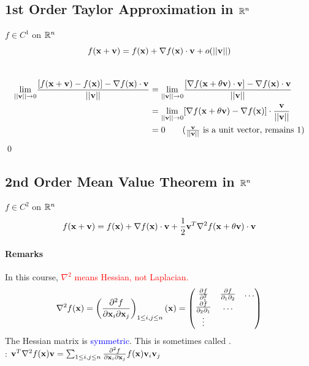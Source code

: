 \documentclass[11pt]{article}
\begin{document}
\subsection{1st Order Taylor Approximation in $\mathbb{R}^n$}
$f \in C^1$ on $\mathbb{R}^n$
$$f(\textbf{x} + \textbf{v}) = f(\textbf{x}) + \nabla f(\textbf{x}) \cdot \textbf{v} + o(||\textbf{v}||)$$
 \\
\begin{align*}
	\underset{||\vv|| \rightarrow 0}{\lim} \frac{[f(\vx + \vv) - f(\vx)] - \nabla f(\vx) \cdot \vv }{||\vv||} 
	&= \underset{||\vv|| \rightarrow 0}{\lim} \frac{[\nabla f(\vx + \theta \vv) \cdot \vv] - \nabla f(\vx) \cdot \vv}{||\vv||} \\
	&= \underset{||\vv|| \rightarrow 0}{\lim} [\nabla f(\vx + \theta \vv) - \nabla f(\vx)] \cdot \frac{\vv}{||\vv||} \\
	&= 0 \tag{$\frac{\vv}{||\vv||}$ is a unit vector, remains 1}
\end{align*}
\qed
\subsection{2nd Order Mean Value Theorem in $\mathbb{R}^n$}
$f \in C^2$ on $\mathbb{R} ^n$
$$ f(\textbf{x} + \textbf{v}) = f(\textbf{x}) + \nabla f(\textbf{x}) \cdot \textbf{v} + \frac{1}{2}\textbf{v}^T\nabla^2 f(\textbf{x} + \theta \textbf{v}) \cdot \textbf{v}$$
\paragraph{Remarks}
In this course, \textcolor{red}{$\nabla^2$ means Hessian, not Laplacian.}
$$\nabla^2 f(\textbf{x}) =  \left( \frac{\partial^2 f}{\partial \textbf{x}_i \partial \textbf{x}_j}\right)_{1\leq i, j\leq n}(\textbf{x}) = \begin{pmatrix}
	\frac{\partial f}{\partial_1^2} & \frac{\partial f}{\partial_1 \partial_2} & \hdots \\
	\frac{\partial f}{\partial_2 \partial_1} & \hdots \\
	\vdots
\end{pmatrix}$$
The Hessian matrix is \textcolor{blue}{symmetric}. This is sometimes called .\\
: $\textbf{v}^T \nabla^2 f(\textbf{x})\textbf{v} = \sum_{1 \leq i, j\leq n} \frac{\partial^2 f}{\partial \textbf{x}_i \partial \textbf{x}_j}f(\textbf{x})\textbf{v}_i \textbf{v}_j$
\end{document}
